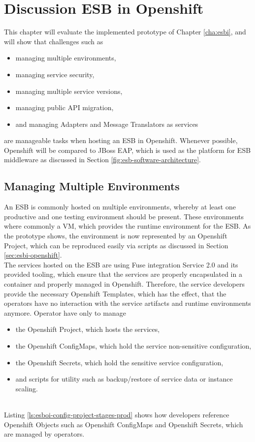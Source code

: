 \chapter{Discussion ESB in Openshift}
\label{cha:esbd}
This chapter will evaluate the implemented prototype of Chapter \vref{cha:esbi}, and will show that challenges such as
\begin{itemize}
	\item managing multiple environments,
	\item managing service security,
	\item managing multiple service versions,
	\item managing public API migration,
	\item and managing Adapters and Message Translators as services
\end{itemize}
are manageable tasks when hosting an ESB in Openshift. Whenever possible, Openshift will be compared to JBoss EAP, which is used as the platform for ESB middleware as discussed in Section \vref{fig:esb-software-architecture}.

\section{Managing Multiple Environments}
\label{sec:esbd-multiple-env}
An ESB is commonly hosted on multiple environments, whereby at least one productive and one testing environment should be present. These environments where commonly a VM, which provides the runtime environment for the ESB. As the prototype shows, the environment is now represented by an Openshift Project, which can be reproduced easily via scripts as discussed in Section \vref{sec:esbi-openshift}. \\

The services hosted on the ESB are using Fuse integration Service 2.0 and its provided tooling, which ensure that the services are properly encapsulated in a container and properly managed in Openshift. Therefore, the service developers provide the necessary Openshift Templates, which has the effect, that the operators have no interaction with the service artifacts and runtime environments anymore. Operator have only to manage
\begin{itemize}
	\item the Openshift Project, which hosts the services,
	\item the Openshift ConfigMaps, which hold the service non-sensitive configuration,
	\item the Openshift Secrets, which hold the sensitive service configuration,
	\item and scripts for utility such as backup/restore of service data or instance scaling.
\end{itemize} 
\ \\
Listing \vref{ls:esboi-config-project-stages-prod} shows how developers reference Openshift Objects such as Openshift ConfigMaps and Openshift Secrets, which are managed by operators. 

